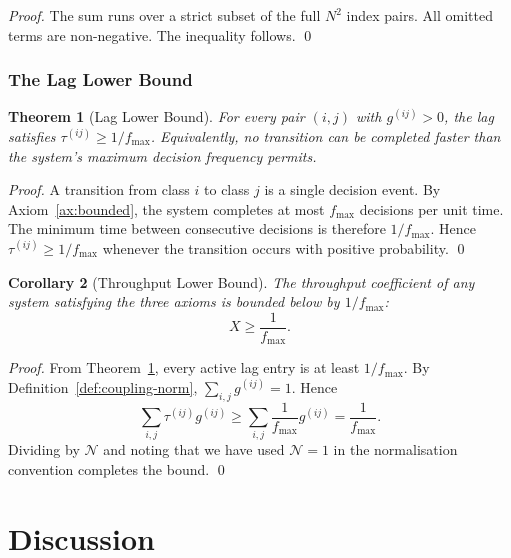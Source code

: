 \documentclass[twocolumn,11pt,a4paper]{article}
\newtheorem{theorem}{Theorem}[section]
\newtheorem{corollary}[theorem]{Corollary}
\newcommand{\TP}{X}
\newcommand{\Norm}{\mathcal{N}}
\newcommand{\lag}{\tau}
\newcommand{\cpl}{g}
\newcommand{\classcount}{N}
\begin{document}
\begin{proof}
The sum runs over a strict subset of the full $\classcount^2$ index pairs. All omitted terms are non-negative. The inequality follows. \qed
\end{proof}

\section{The Lag Lower Bound}
\label{sec:lag-bound}

\begin{theorem}[Lag Lower Bound]
\label{thm:lag-bound}
For every pair $(i, j)$ with $\cpl^{(ij)} > 0$, the lag satisfies $\lag^{(ij)} \geq 1/f_{\max}$. Equivalently, no transition can be completed faster than the system's maximum decision frequency permits.
\end{theorem}

\begin{proof}
A transition from class $i$ to class $j$ is a single decision event. By Axiom~\ref{ax:bounded}, the system completes at most $f_{\max}$ decisions per unit time. The minimum time between consecutive decisions is therefore $1/f_{\max}$. Hence $\lag^{(ij)} \geq 1/f_{\max}$ whenever the transition occurs with positive probability. \qed
\end{proof}

\begin{corollary}[Throughput Lower Bound]
\label{cor:throughput-lower}
The throughput coefficient of any system satisfying the three axioms is bounded below by $1/f_{\max}$:
\[
\TP \geq \frac{1}{f_{\max}}.
\]
\end{corollary}

\begin{proof}
From Theorem~\ref{thm:lag-bound}, every active lag entry is at least $1/f_{\max}$. By Definition~\ref{def:coupling-norm}, $\sum_{i,j} \cpl^{(ij)} = 1$. Hence
\[
\sum_{i,j} \lag^{(ij)} \cpl^{(ij)} \geq \sum_{i,j} \frac{1}{f_{\max}} \cpl^{(ij)} = \frac{1}{f_{\max}}.
\]
Dividing by $\Norm$ and noting that we have used $\Norm = 1$ in the normalisation convention completes the bound. \qed
\end{proof}

\part{Discussion}
\end{document}
